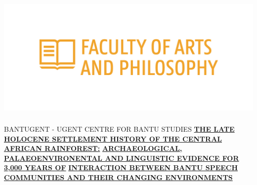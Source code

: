 \documentclass[a0]{sciposter}
\begin{document}
\vspace*{-2cm}\hspace*{-2cm}\includegraphics[width = 14.47cm, height = 6.2cm]{img/logos/icon_UGent_LW_EN_RGB_2400_color.png}

\colorbox{BoxCol}{
\begin{minipage}[t][102cm][t]{82cm}

\vspace{2cm}\hspace{2cm}\begin{minipage}[t]{77cm}
{\fontsize{50}{52}\selectfont\textcolor{HeadCol}{\uppercase{BantUGent - UGent Centre for Bantu Studies}}}
\bigbreak\bigbreak
{\fontsize{40}{44}}
\bigbreak\bigbreak
{\fontsize{44}{50}\selectfont\textcolor{HeadCol}{\uline{\textbf{\uppercase{The Late Holocene Settlement History of the Central African Rainforest:}}}}}
\bigbreak
{\fontsize{44}{50}\selectfont\textcolor{HeadCol}{\uline{\textbf{\uppercase{Archaeological, Palaeoenvironental and Linguistic Evidence for 3,000 years of}}}}}
\bigbreak
{\fontsize{44}{50}\selectfont\textcolor{HeadCol}{\uline{\textbf{\uppercase{Interaction between Bantu Speech Communities and their Changing Environments}}}}}
\end{minipage}


\end{minipage}}
\end{document}

